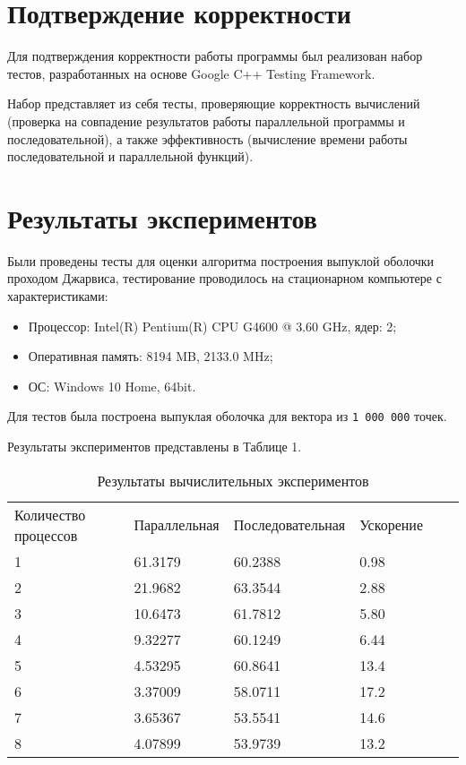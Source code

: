 \documentclass{report}
\begin{document}
\section*{Подтверждение корректности}
Для подтверждения корректности работы программы был реализован набор тестов, разработанных на основе Google C++ Testing Framework.
\par Набор представляет из себя тесты, проверяющие корректность вычислений (проверка на совпадение результатов работы параллельной программы и последовательной), а также эффективность (вычисление времени работы последовательной и параллельной функций).
\newpage

\section*{Результаты экспериментов}
Были проведены тесты для оценки алгоритма построения выпуклой оболочки проходом Джарвиса, тестирование проводилось на стационарном компьютере с характеристиками:

\begin{itemize}
\item Процессор: Intel(R) Pentium(R) CPU G4600 @ 3.60 GHz, ядер: 2;
\item Оперативная память: 8194 MB, 2133.0 MHz;
\item ОС: Windows 10 Home, 64bit.
\end{itemize}

\par Для тестов была построена выпуклая оболочка для вектора из \verb|1 000 000| точек. 
\par Результаты экспериментов представлены в Таблице 1.

\begin{table}[!h]
\caption{Результаты вычислительных экспериментов}
\centering
\begin{tabular}{llllll}
Количество процессов & Параллельная & Последовательная & Ускорение  \\
1        & 61.3179        & 60.2388      & 0.98                     \\
2        & 21.9682        & 63.3544      & 2.88                     \\
3        & 10.6473        & 61.7812      & 5.80                     \\
4        & 9.32277        & 60.1249      & 6.44                     \\
5        & 4.53295        & 60.8641      & 13.4                     \\
6        & 3.37009        & 58.0711      & 17.2                     \\
7        & 3.65367        & 53.5541      & 14.6                     \\
8        & 4.07899        & 53.9739      & 13.2      
\end{tabular}
\end{table}
\end{document}
